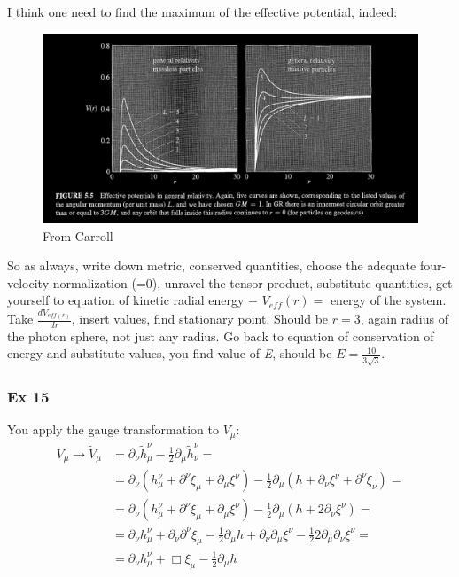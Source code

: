 I think one need to find the maximum of the effective potential, indeed:
\begin{figure}[h]
\centering
\includegraphics[width=\linewidth]{imm/ex14.png}
\caption{From Carroll}

\label{imm:ex14.png}
\end{figure}

So as always, write down metric, conserved quantities, choose the adequate four-velocity normalization (=0), unravel the tensor product, substitute quantities, get yourself to equation of kinetic radial energy + $V_{eff}\left( r \right) = $ energy of the system. Take $ \frac{d V_{eff\left( r \right)}}{d r}$,  insert values, find stationary point. Should be $r = 3$, again radius of the photon sphere, not just any radius. Go back to equation of conservation of energy and substitute values, you find value of \emph{E}, should be $E = \frac{10}{3\sqrt{3}}$.

\subsubsection{Ex 15}

You apply the gauge transformation to $V_{\mu }$:
\begin{align*}
	V_{\mu } \to  \tilde{V}_{\mu } &= \partial_{\nu }\tilde{h}^{\nu }_{\mu } - \frac{1}{2}\partial_{\mu }\tilde{h}^{\nu }_{\nu } =\\
				       &= \partial_{\nu }\left( h^{\nu }_{\mu } + \partial^{\nu }\xi _{\mu } + \partial_{\mu }\xi ^{\nu } \right) - \frac{1}{2}\partial_{\mu }\left( h + \partial_{\nu }\xi ^{\nu }+\partial^{\nu }\xi _{\nu } \right) = \\
				       &= \partial_{\nu }\left( h^{\nu }_{\mu } + \partial^{\nu }\xi _{\mu } + \partial_{\mu }\xi ^{\nu } \right) - \frac{1}{2}\partial_{\mu }\left( h + 2\partial_{\nu }\xi ^{\nu } \right) = \\
				       &= \partial_{\nu }h^{\nu }_{\mu } + \partial_{\nu }\partial^{\nu }\xi _{\mu } - \frac{1}{2} \partial_{\mu }h + \partial_{\nu }\partial_{\mu }\xi ^{\nu }- \frac{1}{2}2 \partial_{\mu }\partial_{\nu }\xi ^{\nu } = \\
				       &= \partial_{\nu }h^{\nu}_{\mu } + \Box \xi _{\mu } - \frac{1}{2}\partial_{\mu }h
\end{align*}

